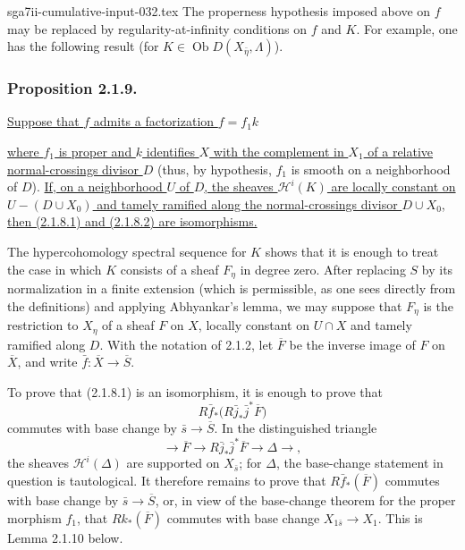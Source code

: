 \begin{filecontents*}{sga7ii-cumulative-input-032.tex}
The properness hypothesis imposed above on $f$ may be replaced by
regularity-at-infinity conditions on $f$ and $K$.  For example, one has
the following result (for
$K\in\operatorname{Ob}D(X_{\bar\eta},\Lambda)$).

\subsubsection*{Proposition 2.1.9.}
\underline{Suppose that $f$ admits a factorization $f=f_1k$}
\begin{center}
\end{center}
\underline{where $f_1$ is proper and $k$ identifies $X$ with the
complement in $X_1$ of a relative normal-crossings divisor $D$}
(thus, by hypothesis, $f_1$ is smooth on a neighborhood of $D$).
\underline{If, on a neighborhood $U$ of $D$, the sheaves
$\mathcal H^i(K)$ are locally constant on $U-(D\cup X_0)$ and tamely
ramified along the normal-crossings divisor $D\cup X_0$, then
(2.1.8.1) and (2.1.8.2) are isomorphisms.}

The hypercohomology spectral sequence for $K$ shows that it is enough
to treat the case in which $K$ consists of a sheaf $F_\eta$ in degree
zero.  After replacing $S$ by its normalization in a finite extension
(which is permissible, as one sees directly from the definitions) and
applying Abhyankar's lemma, we may suppose that $F_\eta$ is the
restriction to $X_\eta$ of a sheaf $F$ on $X$, locally constant on
$U\cap X$ and tamely ramified along $D$.  With the notation of 2.1.2,
let $\overline F$ be the inverse image of $F$ on $\overline X$, and
write $\bar f:\overline X\longrightarrow\overline S$.

To prove that (2.1.8.1) is an isomorphism, it is enough to prove that
\[
R\bar f_*\bigl(R\bar j_*\bar j^*\overline F\bigr)
\]
commutes with base change by $\bar s\longrightarrow\overline S$.  In
the distinguished triangle
\[
\longrightarrow\overline F\longrightarrow
R\bar j_*\bar j^*\overline F\longrightarrow\Delta\longrightarrow,
\]
the sheaves $\mathcal H^i(\Delta)$ are supported on $X_{\bar s}$; for
$\Delta$, the base-change statement in question is tautological.  It
therefore remains to prove that $R\bar f_*(\overline F)$ commutes with
base change by $\bar s\longrightarrow\overline S$, or, in view of the
base-change theorem for the proper morphism $f_1$, that
$Rk_*(\overline F)$ commutes with base change
$X_{1\bar s}\longrightarrow X_1$.  This is Lemma 2.1.10 below.


\end{filecontents*}
